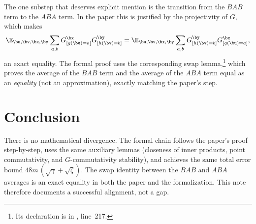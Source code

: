 \documentclass{article}
\newcommand{\ABA}{\textit{ABA}}
\newcommand{\BAB}{\textit{BAB}}
\begin{document}
The one substep that deserves explicit mention is the transition
from the $\BAB$ term to the $\ABA$ term. In the paper this is
justified by the projectivity of $G$, which makes
\[
  \E_{\bu,\bv,\bx,\by} \sum_{a,b} G^{\bx}_{[g(\bu)=a]}
  G^{\by}_{[h(\bv)=b]}
  = 
  \E_{\bu,\bv,\bx,\by} \sum_{a,b} G^{\by}_{[h(\bv)=b]}
  G^{\bx}_{[g(\bu)=a]},
\]
an exact equality. The formal proof uses the corresponding swap
lemma,\footnote{Its declaration is
 in
,
line~217.}
which proves the average of the $\BAB$ term and the average of the
$\ABA$ term equal as an \emph{equality} (not an approximation),
exactly matching the paper's step.

\section{Conclusion}

There is no mathematical divergence. The formal chain follows the
paper's proof step-by-step, uses the same auxiliary lemmas (closeness
of inner products, point commutativity, and $G$-commutativity
stability), and achieves the same total error bound
$48m\,(\sqrt{\gamma}+\sqrt{\zeta})$. The swap identity between the
$\BAB$ and $\ABA$ averages is an exact equality in both the paper
and the formalization. This note therefore documents a successful
alignment, not a gap.



\end{document}
